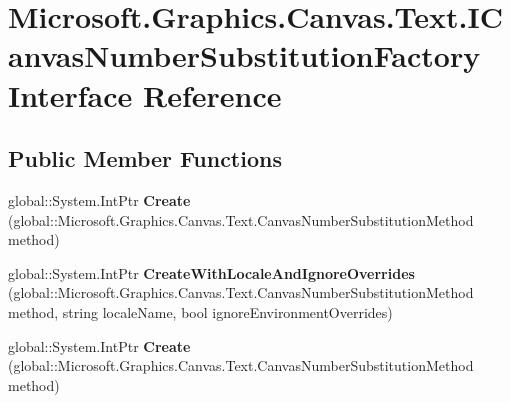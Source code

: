 \hypertarget{interface_microsoft_1_1_graphics_1_1_canvas_1_1_text_1_1_i_canvas_number_substitution_factory}{}\section{Microsoft.\+Graphics.\+Canvas.\+Text.\+I\+Canvas\+Number\+Substitution\+Factory Interface Reference}
\label{interface_microsoft_1_1_graphics_1_1_canvas_1_1_text_1_1_i_canvas_number_substitution_factory}
\subsection*{Public Member Functions}
\begin{DoxyCompactItemize}
\item 
\mbox{\label{interface_microsoft_1_1_graphics_1_1_canvas_1_1_text_1_1_i_canvas_number_substitution_factory_abee228335a4826f4809b5932bdb32ae2}} 
global\+::\+System.\+Int\+Ptr {\bfseries Create} (global\+::\+Microsoft.\+Graphics.\+Canvas.\+Text.\+Canvas\+Number\+Substitution\+Method method)
\item 
\mbox{\label{interface_microsoft_1_1_graphics_1_1_canvas_1_1_text_1_1_i_canvas_number_substitution_factory_a02cc93fd08d82ad029a3ad58cd6c1a9e}} 
global\+::\+System.\+Int\+Ptr {\bfseries Create\+With\+Locale\+And\+Ignore\+Overrides} (global\+::\+Microsoft.\+Graphics.\+Canvas.\+Text.\+Canvas\+Number\+Substitution\+Method method, string locale\+Name, bool ignore\+Environment\+Overrides)
\item 
\mbox{\label{interface_microsoft_1_1_graphics_1_1_canvas_1_1_text_1_1_i_canvas_number_substitution_factory_abee228335a4826f4809b5932bdb32ae2}} 
global\+::\+System.\+Int\+Ptr {\bfseries Create} (global\+::\+Microsoft.\+Graphics.\+Canvas.\+Text.\+Canvas\+Number\+Substitution\+Method method)
\item 
\mbox{\label{interface_microsoft_1_1_graphics_1_1_canvas_1_1_text_1_1_i_canvas_number_substitution_factory_a02cc93fd08d82ad029a3ad58cd6c1a9e}} 

\end{DoxyCompactItemize}
